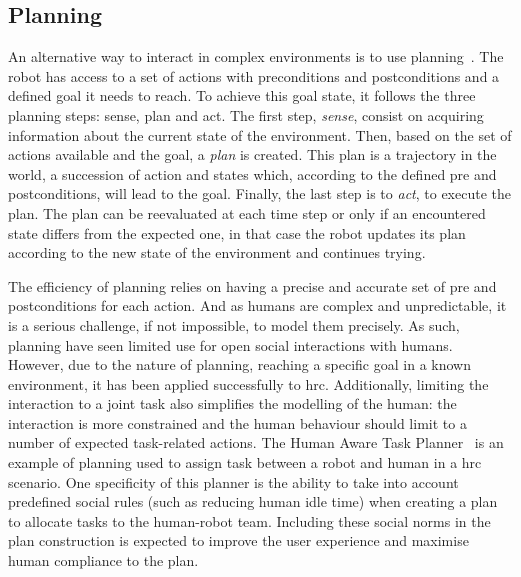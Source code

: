 \subsection{Planning} \label{ssec:planning}
    
    An alternative way to interact in complex environments is to use planning~\citep{asada1986robot}. The robot has access to a set of actions with preconditions and postconditions and a defined goal it needs to reach. To achieve this goal state, it follows the three planning steps: sense, plan and act. The first step, \emph{sense}, consist on acquiring information about the current state of the environment. Then, based on the set of actions available and the goal, a \emph{plan} is created. This plan is a trajectory in the world, a succession of action and states which, according to the defined pre and postconditions, will lead to the goal. Finally, the last step is to \emph{act}, to execute the plan. The plan can be reevaluated at each time step or only if an encountered state differs from the expected one, in that case the robot updates its plan according to the new state of the environment and continues trying.
    
    
    The efficiency of planning relies on having a precise and accurate set of pre and postconditions for each action. And as humans are complex and unpredictable, it is a serious challenge, if not impossible, to model them precisely. As such, planning have seen limited use for open social interactions with humans. However, due to the nature of planning, reaching a specific goal in a known environment, it has been applied successfully to \gls{hrc}. Additionally, limiting the interaction to a joint task also simplifies the modelling of the human: the interaction is more constrained and the human behaviour should limit to a number of expected task-related actions. The Human Aware Task Planner~\citep{alili2009task} is an example of planning used to assign task between a robot and human in a \gls{hrc} scenario. One specificity of this planner is the ability to take into account predefined social rules (such as reducing human idle time) when creating a plan to allocate tasks to the human-robot team. Including these social norms in the plan construction is expected to improve the user experience and  maximise human compliance to the plan.
    
